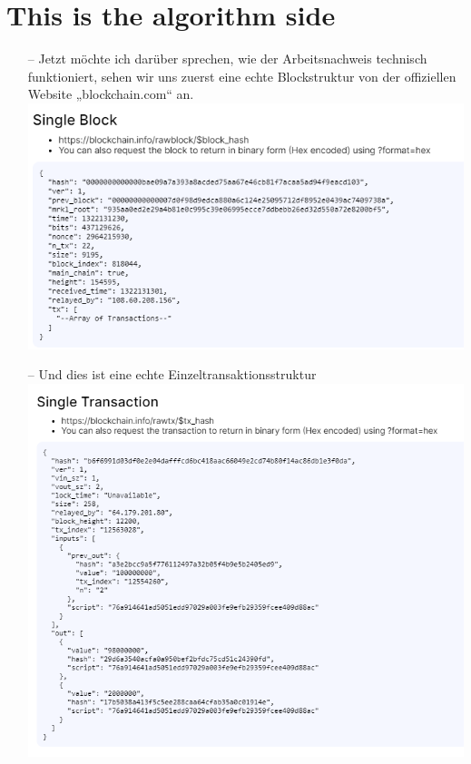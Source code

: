\documentclass[ngerman]{scrreprt}
\begin{document}
\section{This is the algorithm side}
\begin{itemize}
	\item[--] Jetzt möchte ich darüber sprechen, wie der Arbeitsnachweis technisch funktioniert, sehen wir uns zuerst eine echte Blockstruktur von der offiziellen Website „blockchain.com“ an. \\
	\includegraphics[width=\linewidth]{realblock.png} \\
	\item[--] Und dies ist eine echte Einzeltransaktionsstruktur \\
	\includegraphics[width=\linewidth]{realtransaction.png} \\ \\

\end{itemize}
\end{document}
